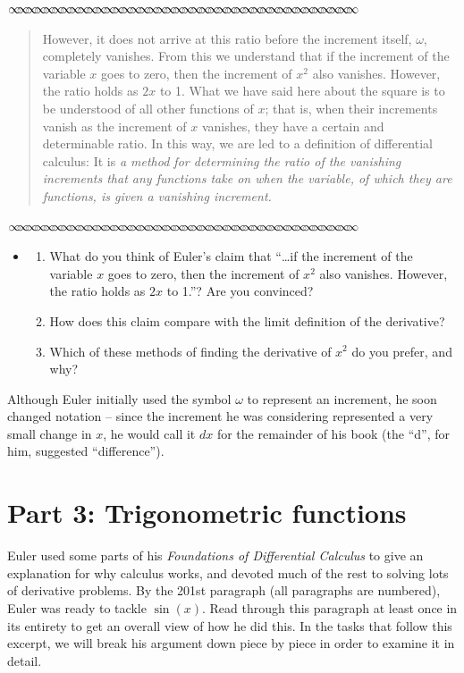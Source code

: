 \documentclass[11pt]{article}
\newcommand{\sep}{\vspace{-3pt}
\begin{center}
{\mathversion{normal}
$\infty \mspace{-5.5mu}\infty \mspace{-5.5mu}\infty \mspace{-5.5mu}\infty \mspace{-5.5mu}
\infty \mspace{-5.5mu}\infty \mspace{-5.5mu}\infty \mspace{-5.5mu}\infty \mspace{-5.5mu}
\infty \mspace{-5.5mu}\infty \mspace{-5.5mu}\infty \mspace{-5.5mu}\infty \mspace{-5.5mu}
\infty \mspace{-5.5mu}\infty \mspace{-5.5mu}\infty \mspace{-5.5mu}\infty \mspace{-5.5mu}
\infty \mspace{-5.5mu}\infty \mspace{-5.5mu}\infty \mspace{-5.5mu}\infty \mspace{-5.5mu}
\infty \mspace{-5.5mu}\infty \mspace{-5.5mu}\infty \mspace{-5.5mu}\infty \mspace{-5.5mu}
\infty \mspace{-5.5mu}\infty \mspace{-5.5mu}\infty \mspace{-5.5mu}\infty \mspace{-5.5mu}
\infty \mspace{-5.5mu}\infty \mspace{-5.5mu}\infty \mspace{-5.5mu}\infty \mspace{-5.5mu}
\infty \mspace{-5.5mu}\infty \mspace{-5.5mu}\infty \mspace{-5.5mu}\infty \mspace{-5.5mu}
\infty \mspace{-5.5mu}\infty \mspace{-5.5mu}\infty \mspace{-5.5mu}\infty \mspace{-5.5mu}$}
\end{center} \vspace*{-5pt}}
\newenvironment{source}%
 {\bigskip \sep \vspace*{-6pt} \begin{quote}
          \begin{sf}   }
   {   \end{sf}     \end{quote} \vspace*{-6pt} \sep \bigskip}%
\newcounter{tasknumb}
\newcommand{\tasknumb}{\stepcounter{tasknumb}\textmd{\textbf{$\fbox{$\fbox{Task \thetasknumb}$}$}}}
\newenvironment{task}%
 {\begin{itemize}
 \item[\tasknumb]  }
{
    \end{itemize}    }%
\begin{document}
\begin{source}

However, it does not arrive at this ratio before the increment itself, $\omega$,
completely vanishes. From this we understand that if the increment of the
variable $x$ goes to zero, then the increment of $x^2$ also vanishes. However,
the ratio holds as $2x$ to 1. What we have said here about the square is to
be understood of all other functions of $x$; that is, when their increments
vanish as the increment of $x$ vanishes, they have a certain and determinable
ratio. In this way, we are led to a definition of differential calculus: It is
\emph{a method for determining the ratio of the vanishing increments that any
functions take on when the variable, of which they are functions, is given a
vanishing increment.}
\vspace*{-8pt}
\end{source}

\newpage
\begin{task}
\begin{enumerate}
\item[(a)] What do you think of Euler's claim  that ``{\sf \ldots if the increment of the
variable $x$ goes to zero, then the increment of $x^2$ also vanishes. However,
the ratio holds as $2x$ to 1.}''? Are you convinced?
\vspace*{-3pt}
\item[(b)] How does this claim compare with the limit definition of the derivative?
\vspace*{-3pt}
\item[(c)] Which of these methods of finding the derivative of $x^2$ do you prefer, and why?	
\end{enumerate}
\end{task}

Although Euler initially used the symbol $\omega$ to represent an increment, he  soon changed notation -- since the increment he was considering represented a very small change in $x$, he would call it $dx$ for the remainder of his book (the ``d'', for him, suggested ``difference'').



\section*{Part 3: Trigonometric functions}

Euler used some parts of his \emph{Foundations of Differential Calculus} to give an explanation for why calculus works, and devoted much of the rest to solving lots of derivative problems.  By the 201st paragraph (all paragraphs are numbered), Euler was ready to tackle $\sin(x)$.  Read through this paragraph at least once in its entirety to get an overall view of how he did this.  In the tasks that follow this excerpt, we will break his argument down piece by piece in order to examine it in  detail.
\end{document}
